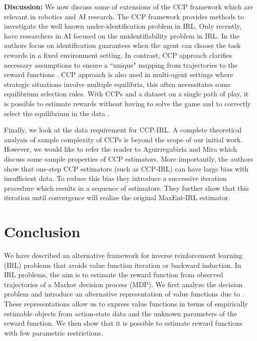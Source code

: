 \documentclass{article}
\begin{document}

\textbf{Discussion:} 
We now discuss some of extensions of the CCP framework which are relevant in robotics and AI research.  
The CCP framework provides methods to investigate the well known under-identification problem in IRL. Only recently, have researchers in AI focused on the unidentifiability problem in IRL. In \cite{amin2017repeated} the authors focus on identification guarantees when the agent can choose the task rewards in a fixed environment setting. In contrast, CCP approach clarifies necessary assumptions to ensure a ``unique" mapping from trajectories to the reward functions \cite{magnac}. CCP approach is also used in multi-agent settings where strategic situations involve multiple equilibria, this often necessitates some equilibrium selection rules. With CCPs and a dataset on a single path of play, it is possible to estimate rewards without having to solve the game and to correctly select the equilibrium in the data \cite{pese}.

Finally, we look at the data requirement for CCP-IRL. A complete theoretical analysis of sample complexity of CCPs is beyond the scope of our initial work. However, we would like to refer the reader to Aguirregabiria and Mira  which discuss some sample properties of CCP estimators.
More importantly, the authors show that one-step CCP estimators (such as CCP-IRL) can have large bias with insufficient data. 
To reduce this bias they introduce a successive iteration procedure which results in a sequence of estimators. They further show that this iteration until convergence will realize the original MaxEnt-IRL estimator.

\section{Conclusion}


We have described an alternative framework for inverse reinforcement learning (IRL) problems that avoids value function iteration or backward induction. In IRL problems, the aim is to estimate the reward function from observed trajectories of a Markov decision process (MDP). We first analyze the decision problem and introduce an alternative representation of value functions due to \cite{hotz}. These representations allow us to express value functions in terms of empirically estimable objects from action-state data and the unknown parameters of the reward function. We then show that it is possible to estimate reward functions with few parametric restrictions. 
\end{document}
